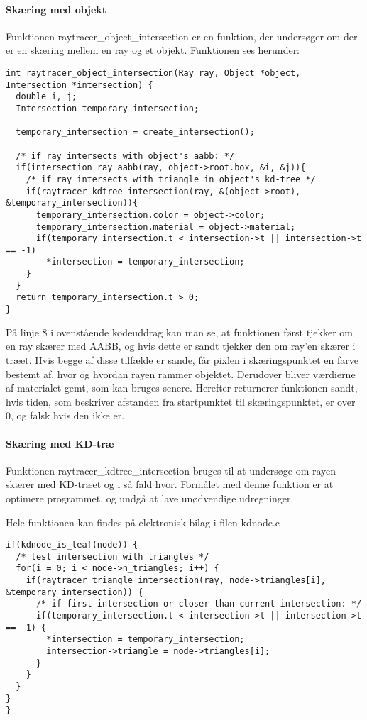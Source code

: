 \paragraph{Skæring med objekt}

Funktionen raytracer\_object\_intersection er en funktion, der undersøger om der er en skæring mellem en ray og et objekt. Funktionen ses herunder:

\begin{lstlisting}[style=Cstyle, caption=raytracer\_object\_intersection]
int raytracer_object_intersection(Ray ray, Object *object, Intersection *intersection) {
  double i, j;
  Intersection temporary_intersection;

  temporary_intersection = create_intersection();

  /* if ray intersects with object's aabb: */
  if(intersection_ray_aabb(ray, object->root.box, &i, &j)){
    /* if ray intersects with triangle in object's kd-tree */
    if(raytracer_kdtree_intersection(ray, &(object->root), &temporary_intersection)){
      temporary_intersection.color = object->color;
      temporary_intersection.material = object->material;
      if(temporary_intersection.t < intersection->t || intersection->t == -1)
        *intersection = temporary_intersection;
    }
  }
  return temporary_intersection.t > 0;
}
\end{lstlisting}

På linje 8 i ovenstående kodeuddrag kan man se, at funktionen først tjekker om en ray skærer med AABB, og hvis dette er sandt tjekker den om ray'en skærer i træet. Hvis begge af disse tilfælde er sande, får pixlen i skæringspunktet en farve bestemt af, hvor og hvordan rayen rammer objektet. Derudover bliver værdierne af materialet gemt, som kan bruges senere. Herefter returnerer funktionen sandt, hvis tiden, som beskriver afstanden fra startpunktet til skæringspunktet, er over 0, og falsk hvis den ikke er.


\paragraph{Skæring med KD-træ}

Funktionen raytracer\_kdtree\_intersection bruges til at undersøge om rayen skærer med KD-træet og i så fald hvor. Formålet med denne funktion er at optimere programmet, og undgå at lave unødvendige udregninger. 

Hele funktionen kan findes på elektronisk bilag i filen kdnode.c

\begin{lstlisting}[style=Cstyle, label=kd_intersection, caption= Uddrag af funktionen raytracer\_kdtree\_intersection]
if(kdnode_is_leaf(node)) {
  /* test intersection with triangles */
  for(i = 0; i < node->n_triangles; i++) {
    if(raytracer_triangle_intersection(ray, node->triangles[i], &temporary_intersection)) {
      /* if first intersection or closer than current intersection: */
      if(temporary_intersection.t < intersection->t || intersection->t == -1) {
        *intersection = temporary_intersection;
        intersection->triangle = node->triangles[i];
      }
    }
  }
}
}
\end{lstlisting}


